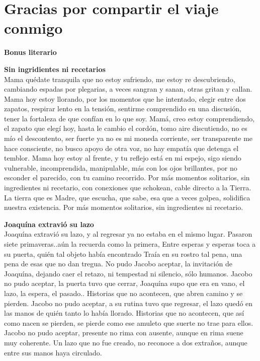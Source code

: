 \documentclass[12pt, a4paper, twoside]{book} %
\begin{document}
\chapter{Gracias por compartir el viaje conmigo}

\noindent\textbf{Bonus literario}\\

\clearpage

\noindent\textbf{Sin ingridientes ni recetarios}\\
Mama quédate tranquila que no estoy sufriendo, me estoy re descubriendo, cambiando espadas por plegarias, a veces sangran y sanan, otras gritan y callan.
Mama hoy estoy llorando, por los momentos que he intentado, elegir entre dos zapatos, respirar lento en la tensión, sentirme comprendido en una discusión, tener la fortaleza de que confían en lo que soy.
Mamá, creo estoy comprendiendo, el zapato que elegí hoy, hasta le cambio el cordón, tomo aire discutiendo, no es mío el descontento, ser fuerte ya no es mi moneda corriente, ser transparente me hace consciente, no busco apoyo de otra voz, no hay empatía que detenga el temblor.
Mama hoy estoy al frente, y tu reflejo está en mi espejo, sigo siendo vulnerable, incomprendida, manipulable, más con los ojos brillantes, por no esconder el parecido, con tu camino recorrido.
Por más momentos solitarios, sin ingredientes ni recetario, con conexiones que schokean, cable directo a la Tierra.
La tierra que es Madre, que escucha, que sabe, esa que a veces golpea, solidifica nuestra existencia.
Por más momentos solitarios, sin ingredientes ni recetario.

\clearpage

\noindent\textbf{Joaquína extravió su lazo}\\
Joaquína extravió su lazo, y al regresar ya no estaba en el mismo lugar.
Pasaron siete primaveras..aún la recuerda como la primera,
Entre esperas y esperas  toca a su puerta, quién tal objeto había encontrado
Traía en su rostro tal pena, una pena de esas que no dan tregua.
No pudo Jacobo aceptar, la invitación de Joaquína, dejando caer el retazo, ni tempestad ni silencio, sólo humanos.
Jacobo no pudo aceptar, la puerta tuvo que cerrar,
Joaquína supo que era en vano,  el lazo, la espera, el pasado..
Historias que no acontecen, que abren camino y se pierden.
Jacobo no pudo aceptar, a su rutina tuvo que regresar, el lazo quedó en las manos de quién tanto lo había llorado.
Historias que no acontecen, que así como nacen se pierden, se pierde como ese amuleto que suerte no trae para ellos.
Jacobo no pudo aceptar, presente no rima con ausente, aunque en rima suene muy coherente.
Un lazo que no fue creado, no reconoce a dos extraños, aunque entre sus manos  haya circulado.
\end{document}
